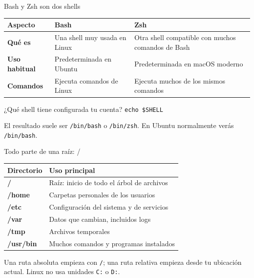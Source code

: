 \documentclass[aspectratio=169,10pt,c]{beamer}
\begin{document}
\begin{frame}{Bash y Zsh son dos shells}
\begin{center}
\small
\begin{tabular}{>{\bfseries}p{2.7cm}p{4.1cm}p{4.1cm}}
\toprule
Aspecto & Bash & Zsh \\
\midrule
Qué es & Una shell muy usada en Linux & Otra shell compatible con muchos comandos de Bash \\
Uso habitual & Predeterminada en Ubuntu & Predeterminada en macOS moderno \\
Comandos & Ejecuta comandos de Linux & Ejecuta muchos de los mismos comandos \\
\bottomrule
\end{tabular}
\end{center}
\vspace{0.3cm}
\begin{block}{¿Qué shell tiene configurada tu cuenta?}
\centering\large\texttt{echo \$SHELL}
\end{block}
\small El resultado suele ser \texttt{/bin/bash} o \texttt{/bin/zsh}. En Ubuntu normalmente verás \texttt{/bin/bash}.
\end{frame}

\begin{frame}{Todo parte de una raíz: /}
\begin{center}
\small
\begin{tabular}{>{\ttfamily\bfseries}p{2.2cm}p{8.4cm}}
\toprule
Directorio & Uso principal \\
\midrule
/ & Raíz: inicio de todo el árbol de archivos \\
/home & Carpetas personales de los usuarios \\
/etc & Configuración del sistema y de servicios \\
/var & Datos que cambian, incluidos logs \\
/tmp & Archivos temporales \\
/usr/bin & Muchos comandos y programas instalados \\
\bottomrule
\end{tabular}
\end{center}
\vspace{0.15cm}
\small Una ruta absoluta empieza con \texttt{/}; una ruta relativa empieza desde tu ubicación actual. Linux no usa unidades \texttt{C:} o \texttt{D:}.
\end{frame}
\end{document}
